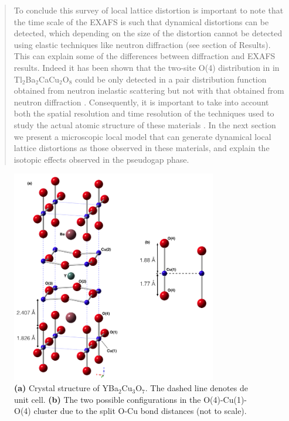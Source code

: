 \begin{quote}
To conclude this survey of local lattice distortion is important to note that the time scale of the EXAFS is such that dynamical distortions can be detected, which depending on the size of the distortion cannot be detected using elastic techniques like neutron diffraction (see section of Results). 
This can explain some of the differences between diffraction and EXAFS results. 
Indeed it has been shown that the two-site O(4) distribution in in Tl$_{2}$Ba$_{2}$CaCu$_{2}$O$_{8}$ could be only detected in a pair distribution function obtained from neutron inelastic scattering but not with that obtained from neutron diffraction \cite{Egami1991}. 
Consequently, it is important to take into account both the spatial resolution and time resolution of the techniques used to study the actual atomic structure of these materials \cite{Mihailovic2005}. 
In the next section we present a microscopic local model that can generate  dynamical local lattice distortions as those observed in these materials, and explain the isotopic effects observed in the pseudogap phase.
\end{quote}


\begin{figure}[ht!]
\centering
\includegraphics[width=0.8\textwidth]{images/YBCO_O-Cu-Ov2.jpg}
\caption{\textbf{(a)} Crystal structure of YBa$_{2}$Cu$_{3}$O$_{7}$. The dashed line denotes de unit cell. \textbf{(b)} The two possible configurations in the O(4)-Cu(1)-O(4) cluster due to the split O-Cu bond distances (not to scale).
}
\label{fig:YBCO_structure}
\end{figure}


